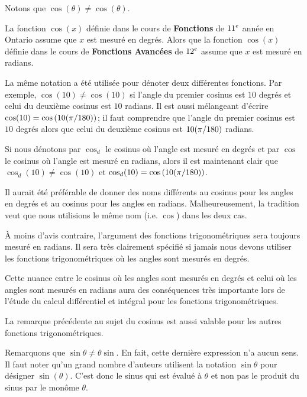 {\begin{rmk}
Notons que  $\cos(\theta) \neq \cos(\theta)$.

La fonction $\cos(x)$ définie dans le cours de
{\bfseries Fonctions} de $\displaystyle 11^e$ année en Ontario assume
que $x$ est mesuré en degrés.  Alors que la fonction $\cos(x)$
définie dans le cours de {\bfseries Fonctions Avancées} de $\displaystyle 12^e$
assume que $x$ est mesuré en radians.

La même notation a été utilisée pour dénoter deux différentes
fonctions.  Par exemple, $\cos(10) \neq \cos(10)$ si l'angle du
premier cosinus est $10$ degrés et celui du deuxième cosinus est $10$
radians.  Il est aussi mélangeant d'écrire $\displaystyle \cos(10) =
\cos\left( 10 (\pi/180)\right)$; il faut comprendre que
l'angle du premier cosinus est $10$ degrés alors que celui du deuxième
cosinus est $\displaystyle 10 (\pi/180)$ radians.

Si nous dénotons par $\cos_{d}$ le cosinus où l'angle est mesuré en
degrés et par $\cos$ le cosinus où l'angle est mesuré en radians,
alors il est maintenant clair que $\cos_{d}(10) \neq \cos(10)$ et
$\displaystyle \cos_{d}(10) = \cos\left( 10 (\pi/180) \right)$.

Il aurait été préférable de donner des noms différents au cosinus pour
les angles en degrés et au cosinus pour les angles en radians.
Malheureusement, la tradition veut que nous utilisions le même nom
(i.e. $\cos$) dans les deux cas.

À moins d'avis contraire, l'argument des fonctions trigonométriques
sera toujours mesuré en radians.  Il sera très clairement spécifié si
jamais nous devons utiliser les fonctions trigonométriques où les angles
sont mesurés en degrés.

Cette nuance entre le cosinus où les angles sont mesurés en degrés et
celui où les angles sont mesurés en radians aura des conséquences très
importante lors de l'étude du calcul différentiel et intégral pour les
fonctions trigonométriques.

La remarque précédente au sujet du cosinus est aussi valable pour les
autres fonctions trigonométriques.
\end{rmk}

\begin{rmk}
Remarquons que $\sin \theta \neq \theta \sin$.  En fait, cette
dernière expression n'a aucun sens.  Il faut noter qu'un grand nombre
d'auteurs utilisent la notation  $\sin \theta$ pour désigner
$\sin(\theta)$.  C'est donc le sinus qui est évalué à $\theta$ et non
pas le produit du sinus par le monôme $\theta$.


\end{rmk}}

